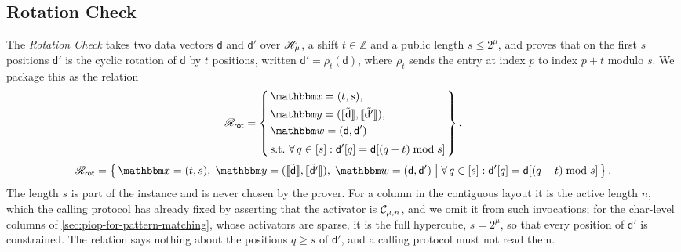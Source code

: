 \subsection{Rotation Check}
The \emph{Rotation Check} takes two data vectors $\mathsf{d}$ and $\mathsf{d}'$ over $\mathscr{H}_{\mu}$, a shift $t \in \mathbb{Z}$ and a public length $s \le 2^\mu$, and proves that on the first $s$ positions $\mathsf{d}'$ is the cyclic rotation of $\mathsf{d}$ by $t$ positions, written $\mathsf{d}' = \rho_t(\mathsf{d})$, where $\rho_t$ sends the entry at index $p$ to index $p+t$ modulo $s$. We package this as the relation
\ifsp
\begin{displaymath}
\NPRelation_{\mathsf{rot}} = \left\{\,
  \begin{aligned}
    & \NPInstance = (t, s),\\
    & \NPInstancey = (\Oracle{\MLE{\mathsf{d}}}, \Oracle{\MLE{\mathsf{d}'}}),\\
    & \NPWitness = (\mathsf{d}, \mathsf{d}')\\[2pt]
    & \text{s.t.}\ \forall\, q \in [s] : \mathsf{d}'[q] = \mathsf{d}[(q - t) \bmod s]
  \end{aligned}
\,\right\}.
\end{displaymath}
\else
\begin{displaymath}
\NPRelation_{\mathsf{rot}} = \left\{\,
  \NPInstance = (t, s),\;
  \NPInstancey = (\Oracle{\MLE{\mathsf{d}}}, \Oracle{\MLE{\mathsf{d}'}}),\;
  \NPWitness = (\mathsf{d}, \mathsf{d}')
  \;\middle|\;
    \forall\, q \in [s] : \mathsf{d}'[q] = \mathsf{d}[(q - t) \bmod s]
\,\right\}.
\end{displaymath}
\fi
The length $s$ is part of the instance and is never chosen by the prover. For a column in the contiguous layout it is the active length $n$, which the calling protocol has already fixed by asserting that the activator is $\mathcal{C}_{\mu,n}$, and we omit it from such invocations; for the char-level columns of \cref{sec:piop-for-pattern-matching}, whose activators are sparse, it is the full hypercube, $s = 2^\mu$, so that every position of $\mathsf{d}'$ is constrained. The relation says nothing about the positions $q \ge s$ of $\mathsf{d}'$, and a calling protocol must not read them.

